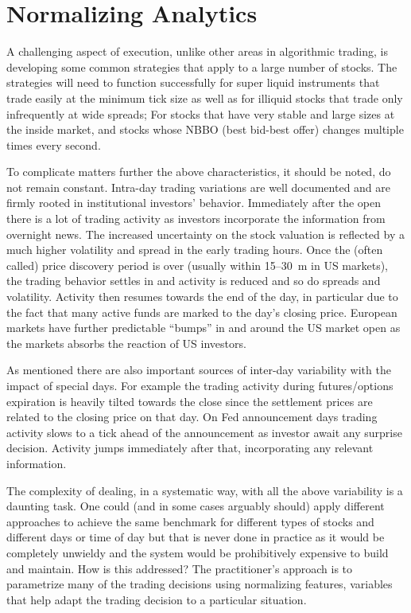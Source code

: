 \section{Normalizing Analytics}

A challenging aspect of execution, unlike other areas in algorithmic trading, is developing some common strategies that apply to a large number of stocks. The strategies will need to function successfully for super liquid instruments that trade easily at the minimum tick size as well as for illiquid stocks that trade only infrequently at wide spreads; For stocks that have very stable and large sizes at the inside market, and stocks whose NBBO (best bid-best offer) changes multiple times every second.


To complicate matters further the above characteristics, it should be noted, do not remain constant. Intra-day trading variations are well documented and are firmly rooted in institutional investors' behavior. Immediately after the open there is a lot of trading activity as investors incorporate the information from overnight news. The increased uncertainty on the stock valuation is reflected by a much higher volatility and spread in the early trading hours. Once the (often called) price discovery period is over (usually within 15--30~m in US markets), the trading behavior settles in and activity is reduced and so do spreads and volatility. Activity then resumes towards the end of the day, in particular due to the  fact that many active funds are marked to the day's closing price. European markets have further predictable ``bumps'' in and around the US market open as the markets absorbs the reaction of US investors.


As mentioned there are also important sources of inter-day variability with the impact of special days. For  example the trading activity during futures/options expiration is heavily tilted towards the close since the settlement prices are related to the closing price on that day. On Fed announcement days trading activity slows to a tick ahead of the announcement as investor await any surprise decision. Activity jumps immediately after that, incorporating any relevant information.


The complexity of dealing, in a systematic way, with all the above variability is a daunting task. One could (and in some cases arguably should) apply different approaches to achieve the same benchmark for different types of stocks and different days or time of day but that is never done in practice as it would be completely unwieldy and the system would be prohibitively expensive to build and maintain. How is this addressed? The practitioner's approach is to parametrize many of the trading decisions using normalizing features, variables that help adapt the trading decision to a particular situation.


